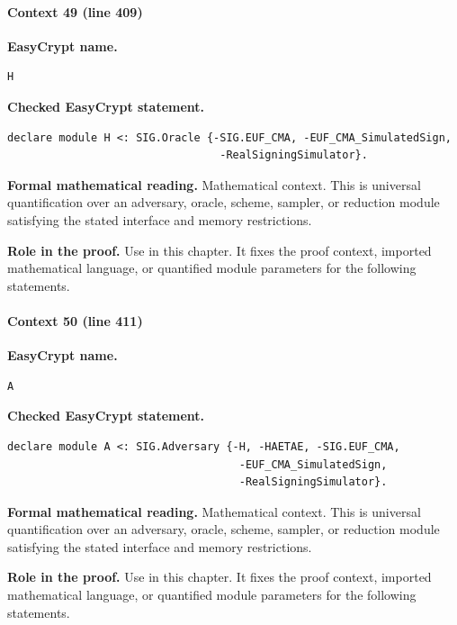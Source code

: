 \paragraph{Context 49 (line 409)}
\noindent\textbf{EasyCrypt name.}
\begin{lstlisting}[language=EasyCrypt,basicstyle=\ttfamily\scriptsize]
H
\end{lstlisting}
\noindent\textbf{Checked EasyCrypt statement.}
\begin{lstlisting}[language=EasyCrypt,basicstyle=\ttfamily\scriptsize]
declare module H <: SIG.Oracle {-SIG.EUF_CMA, -EUF_CMA_SimulatedSign,
                                 -RealSigningSimulator}.
\end{lstlisting}
\noindent\textbf{Formal mathematical reading.}
Mathematical context. This is universal quantification over an adversary, oracle, scheme, sampler, or reduction module satisfying the stated interface and memory restrictions.

\noindent\textbf{Role in the proof.}
Use in this chapter. It fixes the proof context, imported mathematical language, or quantified module parameters for the following statements.

\paragraph{Context 50 (line 411)}
\noindent\textbf{EasyCrypt name.}
\begin{lstlisting}[language=EasyCrypt,basicstyle=\ttfamily\scriptsize]
A
\end{lstlisting}
\noindent\textbf{Checked EasyCrypt statement.}
\begin{lstlisting}[language=EasyCrypt,basicstyle=\ttfamily\scriptsize]
declare module A <: SIG.Adversary {-H, -HAETAE, -SIG.EUF_CMA,
                                    -EUF_CMA_SimulatedSign,
                                    -RealSigningSimulator}.
\end{lstlisting}
\noindent\textbf{Formal mathematical reading.}
Mathematical context. This is universal quantification over an adversary, oracle, scheme, sampler, or reduction module satisfying the stated interface and memory restrictions.

\noindent\textbf{Role in the proof.}
Use in this chapter. It fixes the proof context, imported mathematical language, or quantified module parameters for the following statements.

